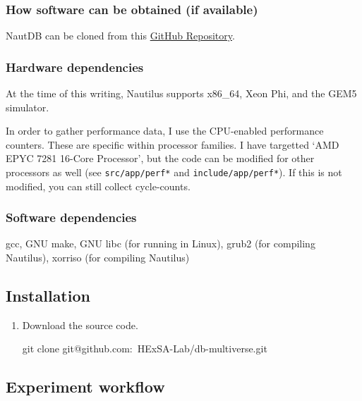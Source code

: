 \documentclass{IEEEtran}
\begin{document}
\subsubsection{How software can be obtained (if available)}

NautDB can be cloned from this \href{https://github.com/HExSA-Lab/db-multiverse/}{GitHub Repository}.

\subsubsection{Hardware dependencies}

At the time of this writing, Nautilus supports x86\_64, Xeon Phi, and the GEM5 simulator.

In order to gather performance data, I use the CPU-enabled performance counters. These are specific within processor families. I have targetted `AMD EPYC 7281 16-Core Processor', but the code can be modified for other processors as well (see \texttt{src/app/perf*} and \texttt{include/app/perf*}). If this is not modified, you can still collect cycle-counts.

\subsubsection{Software dependencies}

gcc, GNU make, GNU libc (for running in Linux), grub2 (for compiling Nautilus), xorriso (for compiling Nautilus)

\subsection{Installation}

\begin{enumerate}
\item Download the source code.

  \begin{shellcode}
    git clone git@github.com:\
    HExSA-Lab/db-multiverse.git
  \end{shellcode}
\end{enumerate}

\subsection{Experiment workflow}
\end{document}
